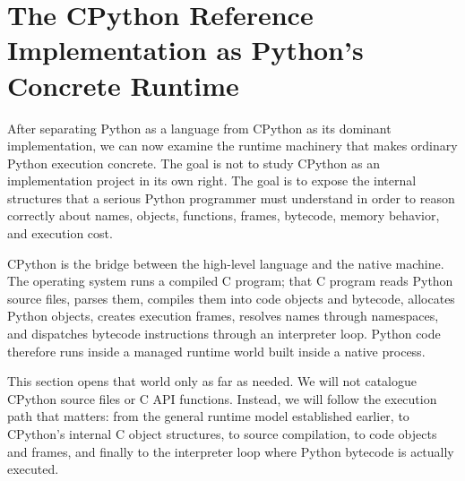 \section{The CPython Reference Implementation as Python's Concrete Runtime}

After separating Python as a language from CPython as its dominant implementation, we can now examine the runtime machinery that makes ordinary Python execution concrete. The goal is not to study CPython as an implementation project in its own right. The goal is to expose the internal structures that a serious Python programmer must understand in order to reason correctly about names, objects, functions, frames, bytecode, memory behavior, and execution cost.

CPython is the bridge between the high-level language and the native machine. The operating system runs a compiled C program; that C program reads Python source files, parses them, compiles them into code objects and bytecode, allocates Python objects, creates execution frames, resolves names through namespaces, and dispatches bytecode instructions through an interpreter loop. Python code therefore runs inside a managed runtime world built inside a native process.

This section opens that world only as far as needed. We will not catalogue CPython source files or C API functions. Instead, we will follow the execution path that matters: from the general runtime model established earlier, to CPython's internal C object structures, to source compilation, to code objects and frames, and finally to the interpreter loop where Python bytecode is actually executed.